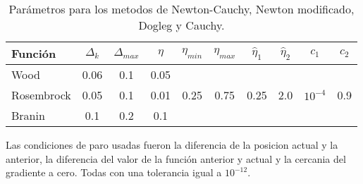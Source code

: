 \begin{table}[H]
    \centering
    \begin{tabular}{lccccccccc} \hline
        Función    & $\Delta_k$ & $\Delta_{max}$ & $\eta$ & $\eta_{min}$          & $\eta_{max}$          & $\hat{\eta}_{1}$      & $\hat{\eta}_{2}$     & $c_1$                      & $c_2$                \\ \hline
        Wood       & 0.06       & 0.1            & 0.05   & \multirow{3}{*}{0.25} & \multirow{3}{*}{0.75} & \multirow{3}{*}{0.25} & \multirow{3}{*}{2.0} & \multirow{3}{*}{$10^{-4}$} & \multirow{3}{*}{0.9} \\
        Rosembrock & 0.05       & 0.1            & 0.01   &                       &                       &                       &                      &                            &                      \\
        Branin     & 0.1        & 0.2            & 0.1    &                       &                       &                       &                      &                            &                      \\ \hline
    \end{tabular}
    \caption{Parámetros para los metodos de Newton-Cauchy, Newton modificado, Dogleg y Cauchy.}
    \label{table:parameters}
\end{table}

Las condiciones de paro usadas fueron la diferencia de la posicion actual y la anterior, la diferencia del valor de la función anterior y actual y la cercania del gradiente a cero. Todas con una tolerancia igual a $10^{-12}$.